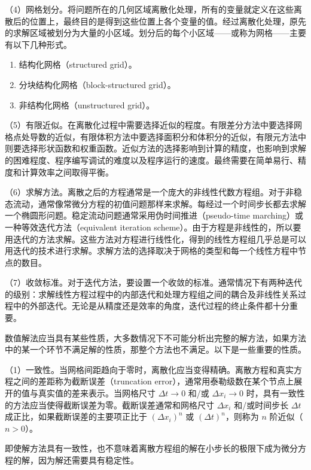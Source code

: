 （4）网格划分。将问题所在的几何区域离散化处理，所有的变量就定义在这些离散后的位置上，最终目的是得到这些位置上各个变量的值。经过离散化处理，原先的求解区域被划分为大量的小区域。划分后的每个小区域——或称为网格——主要有以下几种形式。

\begin{enumerate}
	\item 结构化网格（structured grid）。
	\item 分块结构化网格（block-structured grid）。
	\item 非结构化网格（unstructured grid）。
\end{enumerate}

（5）有限近似。在离散化过程中需要选择近似的程度。有限差分方法中要选择网格点处导数的近似，有限体积方法中要选择面积分和体积分的近似，有限元方法中则要选择形状函数和权重函数。近似方法的选择影响到计算的精度，也影响到求解的困难程度、程序编写调试的难度以及程序运行的速度。最终需要在简单易行、精度和计算效率之间取得平衡。

（6）求解方法。离散之后的方程通常是一个庞大的非线性代数方程组。对于非稳态流动，通常像常微分方程的初值问题那样来求解。每经过一个时间步长都去求解一个椭圆形问题。稳定流动问题通常采用伪时间推进（pseudo-time marching）或一种等效迭代方法（equivalent iteration scheme）。由于方程是非线性的，所以要用迭代的方法求解。这些方法对方程进行线性化，得到的线性方程组几乎总是可以用迭代的技术进行求解。求解方法的选择取决于网格的类型和每一个线性方程中节点的数目。%

（7）收敛标准。对于迭代方法，要设置一个收敛的标准。通常情况下有两种迭代的级别：求解线性方程过程中的内部迭代和处理方程组之间的耦合及非线性关系过程中的外部迭代。无论是从精度还是效率的角度，迭代过程的终止条件都十分重要。

数值解法应当具有某些性质，大多数情况下不可能分析出完整的解方法，如果方法中的某一个环节不满足解的性质，那整个方法也不满足。以下是一些重要的性质。

（1）一致性。当网格间距趋向于零时，离散化应当变得精确。离散方程和真实方程之间的差距称为截断误差（truncation error），通常用泰勒级数在某个节点上展开的值与真实值的差来表示。当网格尺寸 $\Delta t \to 0$ 和/或 $\Delta x_i \to 0$ 时，具有一致性的方法应当使得截断误差为零。截断误差通常和网格尺寸 $\Delta x_i$ 和/或时间步长 $\Delta t$ 成正比，如果截断误差的主要项正比于 $(\Delta x_i)^n$ 或 $(\Delta t)^n$，则称为 $n$ 阶近似（$n>0$）。%

即使解方法具有一致性，也不意味着离散方程组的解在小步长的极限下成为微分方程的解，因为解还需要具有稳定性。


